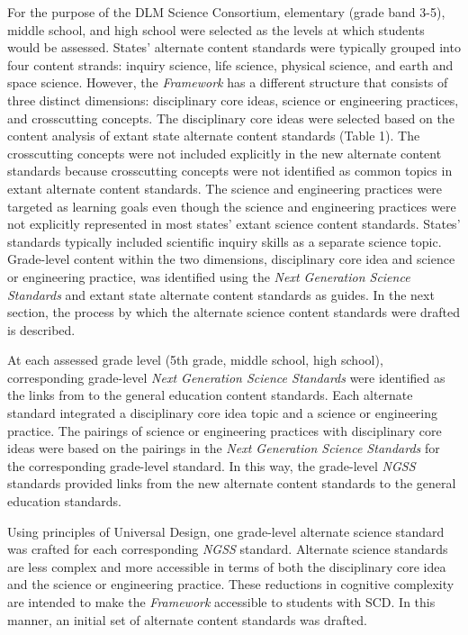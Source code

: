 \documentclass[11.5pt]{sig-alternate} %
\begin{document}
\begin{large}
For the purpose of the DLM Science Consortium, elementary (grade band 3-5), middle school, and high school were selected as the levels at which students would be assessed. States' alternate content standards were typically grouped into four content strands: inquiry science, life science, physical science, and earth and space science. However, the \textit{Framework} has a different structure that consists of three distinct dimensions: disciplinary core ideas, science or engineering practices, and crosscutting concepts. The disciplinary core ideas were selected based on the content analysis of extant state alternate content standards (Table 1). The crosscutting concepts were not included explicitly in the new alternate content standards because crosscutting concepts were not identified as common topics in extant alternate content standards. The science and engineering practices were targeted as learning goals even though the science and engineering practices were not explicitly represented in most states' extant science content standards. States' standards typically included scientific inquiry skills as a separate science topic. Grade-level content within the two dimensions, disciplinary core idea and science or engineering practice, was identified using the \textit{Next Generation Science Standards} and extant state alternate content standards as guides. In the next section, the process by which the alternate science content standards were drafted is described.

At each assessed grade level (5th grade, middle school, high school), corresponding grade-level \textit{Next Generation Science Standards} were identified as the links from to the general education content standards. Each alternate standard integrated a disciplinary core idea topic and a science or engineering practice. The pairings of science or engineering practices with disciplinary core ideas were based on the pairings in the \textit{Next Generation Science Standards} for the corresponding grade-level standard. In this way, the grade-level \textit{NGSS} standards provided links from the new alternate content standards to the general education standards. 

Using principles of Universal Design, one grade-level alternate science standard was crafted for each corresponding \textit{NGSS} standard. Alternate science standards are less complex and more accessible in terms of both the disciplinary core idea and the science or engineering practice. These reductions in cognitive complexity are intended to make the \textit{Framework} accessible to students with SCD. In this manner, an initial set of alternate content standards was drafted. 


\end{large}
\end{document}

